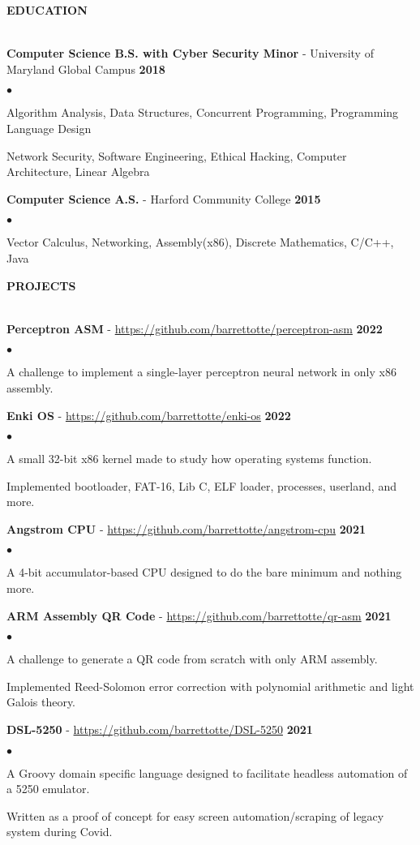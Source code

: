\documentclass{article}
\newcommand{\lineunder}{
	\vspace*{-4pt}\\ 
	\hspace*{-18pt}\hrulefill \\
}
\newcommand{\header}[1]{
	{\hspace*{-15pt}\vspace*{6pt}\textsc{#1}}\vspace*{-6pt}\lineunder
}
\newcommand{\education}[3]{
	\textbf{#1} - #2 \hfill \textbf{#3} \vspace*{3pt}
}
\newcommand{\project}[3]{
	\vspace*{3pt} \textbf{#1} - \small{\href{#2}{#2}} \hfill \textbf{#3} \vspace*{2pt}
}
\newenvironment{resumelist}{
	\vspace*{2pt}
	\begin{list}
		{\small$\bullet$}{\topsep 0pt \itemsep -2pt}}{\vspace*{4pt}
	\end{list}
}
\newcommand{\resumeheader}[1]{
	\vspace*{10pt}
	\header{\textbf{#1}}
    \vspace*{3pt}
}
\begin{document}
	\resumeheader{EDUCATION}
		\education 
			{Computer Science B.S. with Cyber Security Minor}{University of Maryland Global Campus} 
			{2018}
			\begin{resumelist}
				\item Algorithm Analysis, Data Structures, Concurrent Programming, Programming Language Design
				\item Network Security, Software Engineering, Ethical Hacking, Computer Architecture, Linear Algebra
			\end{resumelist}
			\vspace*{6pt}
		\education
			{Computer Science A.S.}{Harford Community College}
			{2015}
			\begin{resumelist}
				\item Vector Calculus, Networking, Assembly(x86), Discrete Mathematics, C/C++, Java
			\end{resumelist}
	
	\resumeheader{PROJECTS}
		\project
			{Perceptron ASM}{https://github.com/barrettotte/perceptron-asm}
			{2022}
			\begin{resumelist}
				\item A challenge to implement a single-layer perceptron neural network in only x86 assembly.
			\end{resumelist}
		\project
			{Enki OS}{https://github.com/barrettotte/enki-os}
			{2022}
			\begin{resumelist}
				\item A small 32-bit x86 kernel made to study how operating systems function.
				\item Implemented bootloader, FAT-16, Lib C, ELF loader, processes, userland, and more.
			\end{resumelist}
		\project
			{Angstrom CPU}{https://github.com/barrettotte/angstrom-cpu}
			{2021}
			\begin{resumelist}
				\item A 4-bit accumulator-based CPU designed to do the bare minimum and nothing more.
			\end{resumelist}
		\project
			{ARM Assembly QR Code}{https://github.com/barrettotte/qr-asm}
			{2021}
			\begin{resumelist}
				\item A challenge to generate a QR code from scratch with only ARM assembly.
				\item Implemented Reed-Solomon error correction with polynomial arithmetic and light Galois theory.
			\end{resumelist}
		\project
			{DSL-5250}{https://github.com/barrettotte/DSL-5250}
			{2021}
			\begin{resumelist}
				\item A Groovy domain specific language designed to facilitate headless automation of a 5250 emulator.
				\item Written as a proof of concept for easy screen automation/scraping of legacy system during Covid.
			\end{resumelist}
\end{document}
